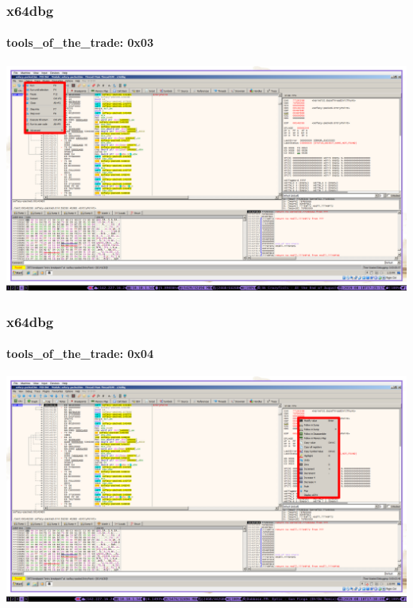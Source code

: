 \documentclass[aspectratio=169]{beamer}
\begin{document}
\begin{frame}
  \frametitle{x64dbg}
  \framesubtitle{tools\_of\_the\_trade: 0x03}
  \begin{center}
    \includegraphics[scale=0.75]{x64dbg-navigation}
  \end{center}
\end{frame}

\begin{frame}
  \frametitle{x64dbg}
  \framesubtitle{tools\_of\_the\_trade: 0x04}
  \begin{center}
    \includegraphics[scale=0.75]{x64dbg-context-menu}
  \end{center}
\end{frame}
\end{document}
